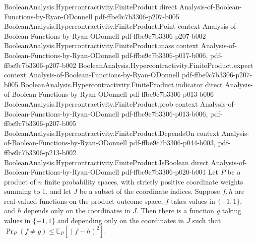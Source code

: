 \begin{theorem}
\leanok
{}
\proofstep
  {BooleanAnalysis.Hypercontractivity.FiniteProduct}
  {direct}
  {Analysis-of-Boolean-Functions-by-Ryan-ODonnell}
  {pdf-ffbe9c7b3306-p207-b005}
\proofstep
  {BooleanAnalysis.Hypercontractivity.FiniteProduct.Point}
  {context}
  {Analysis-of-Boolean-Functions-by-Ryan-ODonnell}
  {pdf-ffbe9c7b3306-p207-b002}
\proofstep
  {BooleanAnalysis.Hypercontractivity.FiniteProduct.mass}
  {context}
  {Analysis-of-Boolean-Functions-by-Ryan-ODonnell}
  {pdf-ffbe9c7b3306-p017-b006,
    pdf-ffbe9c7b3306-p207-b002}
\proofstep
  {BooleanAnalysis.Hypercontractivity.FiniteProduct.expect}
  {context}
  {Analysis-of-Boolean-Functions-by-Ryan-ODonnell}
  {pdf-ffbe9c7b3306-p207-b005}
\proofstep
  {BooleanAnalysis.Hypercontractivity.FiniteProduct.indicator}
  {direct}
  {Analysis-of-Boolean-Functions-by-Ryan-ODonnell}
  {pdf-ffbe9c7b3306-p013-b006}
\proofstep
  {BooleanAnalysis.Hypercontractivity.FiniteProduct.prob}
  {context}
  {Analysis-of-Boolean-Functions-by-Ryan-ODonnell}
  {pdf-ffbe9c7b3306-p013-b006,
    pdf-ffbe9c7b3306-p207-b005}
\proofstep
  {BooleanAnalysis.Hypercontractivity.FiniteProduct.DependsOn}
  {context}
  {Analysis-of-Boolean-Functions-by-Ryan-ODonnell}
  {pdf-ffbe9c7b3306-p044-b003,
    pdf-ffbe9c7b3306-p213-b002}
\proofstep
  {BooleanAnalysis.Hypercontractivity.FiniteProduct.IsBoolean}
  {direct}
  {Analysis-of-Boolean-Functions-by-Ryan-ODonnell}
  {pdf-ffbe9c7b3306-p020-b001}
Let $P$ be a product of $n$ finite probability spaces, with strictly positive coordinate
weights summing to $1$, and let $J$ be a subset of the coordinate indices. Suppose $f,h$
are real-valued functions on the product outcome space, $f$ takes values in $\{-1,1\}$,
and $h$ depends only on the coordinates in $J$. Then there is a function $g$ taking
values in $\{-1,1\}$ and depending only on the coordinates in $J$ such that $\Pr_P(f\ne
g)\leq\mathbb E_P[(f-h)^2]$.
\end{theorem}
